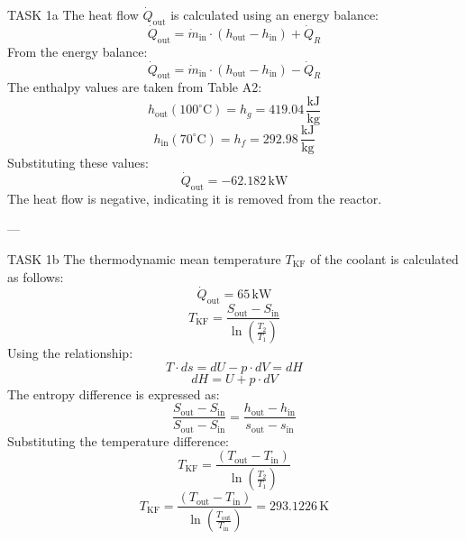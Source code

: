 TASK 1a  
The heat flow \( \dot{Q}_{\text{out}} \) is calculated using an energy balance:  
\[
\dot{Q}_{\text{out}} = \dot{m}_{\text{in}} \cdot (h_{\text{out}} - h_{\text{in}}) + \dot{Q}_R
\]  
From the energy balance:  
\[
\dot{Q}_{\text{out}} = \dot{m}_{\text{in}} \cdot (h_{\text{out}} - h_{\text{in}}) - \dot{Q}_R
\]  
The enthalpy values are taken from Table A2:  
\[
h_{\text{out}} (100^\circ\text{C}) = h_g = 419.04 \, \frac{\text{kJ}}{\text{kg}}
\]  
\[
h_{\text{in}} (70^\circ\text{C}) = h_f = 292.98 \, \frac{\text{kJ}}{\text{kg}}
\]  
Substituting these values:  
\[
\dot{Q}_{\text{out}} = -62.182 \, \text{kW}
\]  
The heat flow is negative, indicating it is removed from the reactor.  

---

TASK 1b  
The thermodynamic mean temperature \( T_{\text{KF}} \) of the coolant is calculated as follows:  
\[
\dot{Q}_{\text{out}} = 65 \, \text{kW}
\]  
\[
T_{\text{KF}} = \frac{S_{\text{out}} - S_{\text{in}}}{\ln \left( \frac{T_2}{T_1} \right)}
\]  
Using the relationship:  
\[
T \cdot ds = dU - p \cdot dV = dH
\]  
\[
dH = U + p \cdot dV
\]  
The entropy difference is expressed as:  
\[
\frac{S_{\text{out}} - S_{\text{in}}}{S_{\text{out}} - S_{\text{in}}} = \frac{h_{\text{out}} - h_{\text{in}}}{s_{\text{out}} - s_{\text{in}}}
\]  
Substituting the temperature difference:  
\[
T_{\text{KF}} = \frac{(T_{\text{out}} - T_{\text{in}})}{\ln \left( \frac{T_2}{T_1} \right)}
\]  
\[
T_{\text{KF}} = \frac{(T_{\text{out}} - T_{\text{in}})}{\ln \left( \frac{T_{\text{out}}}{T_{\text{in}}} \right)} = 293.1226 \, \text{K}
\]  

